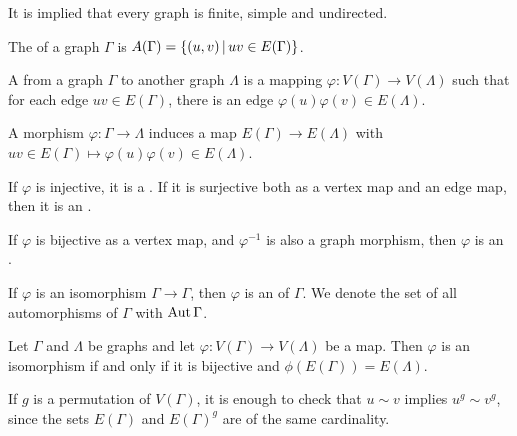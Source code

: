
It is implied that every graph is finite, simple and undirected.

\begin{definition}
  The  of a graph $\Gamma$ is $A(\Gamma) = \{ (u,v) \,|\, uv
  \in E(\Gamma)\}$.
\end{definition}

\begin{definition}
  A  from a graph $\Gamma$ to another graph $\Lambda$ is a
  mapping $\varphi: V(\Gamma) \to V(\Lambda)$ such that for each edge $uv \in
  E(\Gamma)$, there is an edge $\varphi(u) \varphi(v) \in E(\Lambda)$.

\end{definition}

\begin{remark}
  A morphism $\varphi: \Gamma \to \Lambda$ induces a map $E(\Gamma) \to
  E(\Lambda)$ with $uv \in E(\Gamma) \mapsto \varphi(u) \varphi(v) \in
  E(\Lambda)$.
\end{remark}

\begin{definition}
  If $\varphi$ is injective, it is a .
  If it is surjective both as a vertex map and an edge map, then it is an
  .
\end{definition}

\begin{definition}
  If $\varphi$ is bijective as a vertex map, and $\varphi^{-1}$ is also a graph
  morphism, then $\varphi$ is an .
\end{definition}

\begin{definition}
  If $\varphi$ is an isomorphism $\Gamma \to \Gamma$, then $\varphi$ is an
   of $\Gamma$.
  We denote the set of all automorphisms of $\Gamma$ with $\operatorname{Aut}\Gamma$.
\end{definition}

\begin{lemma}
  Let $\Gamma$ and $\Lambda$ be graphs and let $\varphi: V(\Gamma) \to
  V(\Lambda)$ be a map.
  Then $\varphi$ is an isomorphism if and only if it is bijective and
  $\phi(E(\Gamma)) = E(\Lambda)$.
\end{lemma}

\begin{remark}
  If $g$ is a permutation of $V(\Gamma)$, it is enough to check that $u \sim v$
  implies $u^g \sim v^g$, since the sets $E(\Gamma)$ and $E(\Gamma)^g$ are of
  the same cardinality.
\end{remark}

